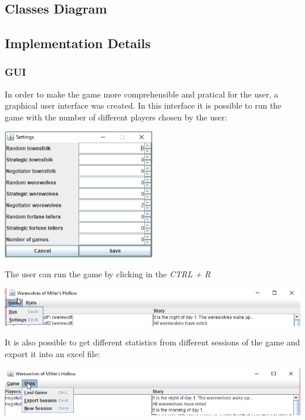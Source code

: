 \documentclass{article}
\begin{document}
\subsection{Classes Diagram}

\subsection{Implementation Details}
\subsubsection{GUI}
In order to make the game more comprehensible and pratical for the user, a graphical user interface was created. 
In this interface it is possible to run the game with the number of different players chosen by the user:\newline
\begin{center}
\includegraphics[width=0.5\textwidth]{./images/settings.png}\par\vspace{1cm}
\end{center}
The user can run the game by clicking in the \textit{CTRL + R}
\begin{center}
\includegraphics[width=1\textwidth]{./images/game_button.png}\par\vspace{1cm}
\end{center}
It is also possible to get different statistics from different sessions of the game and export it into an excel file:
\begin{center}
\includegraphics[width=1\textwidth]{./images/stats_button.png}\par\vspace{1cm}
\end{center}
\end{document}

